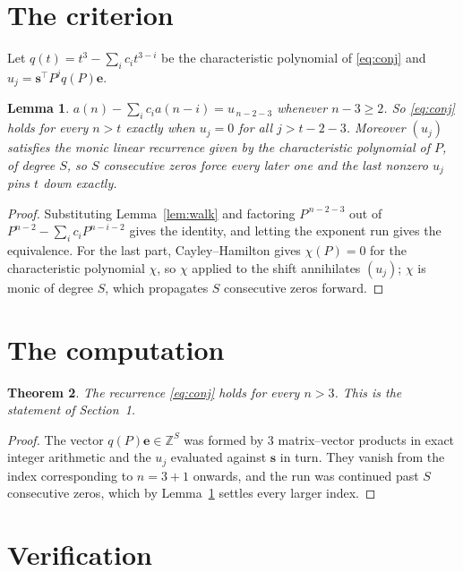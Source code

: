 \documentclass[11pt,a4paper]{article}
\theoremstyle{plain}
\newtheorem{theorem}{Theorem}
\newtheorem{lemma}[theorem]{Lemma}
\theoremstyle{definition}
\begin{document}
\section{The criterion}

Let $q(t)=t^{3}-\sum_i c_i t^{3-i}$ be the characteristic polynomial of
\eqref{eq:conj} and $u_j=\mathbf{s}^{\!\top}P^{j}q(P)\mathbf{e}$.

\begin{lemma}\label{lem:crit}
$a(n)-\sum_i c_i a(n-i)=u_{\,n-2-3}$ whenever $n-3\ge2$. So \eqref{eq:conj}
holds for every $n>t$ exactly when $u_j=0$ for all $j>t-2-3$. Moreover $(u_j)$
satisfies the monic linear recurrence given by the characteristic polynomial of $P$, of
degree $S$, so $S$ consecutive zeros force every later one and the last nonzero $u_j$ pins
$t$ down exactly.
\end{lemma}

\begin{proof}
Substituting Lemma~\ref{lem:walk} and factoring $P^{\,n-2-3}$ out of
$P^{n-2}-\sum_i c_i P^{n-i-2}$ gives the identity, and letting the exponent run gives the
equivalence. For the last part, Cayley--Hamilton gives $\chi(P)=0$ for the characteristic
polynomial $\chi$, so $\chi$ applied to the shift annihilates $(u_j)$; $\chi$ is monic of
degree $S$, which propagates $S$ consecutive zeros forward.
\end{proof}

\section{The computation}

\begin{theorem}
The recurrence \eqref{eq:conj} holds for every $n>3$. This is the statement of
Section~1.
\end{theorem}

\begin{proof}
The vector $q(P)\mathbf{e}\in\mathbb{Z}^{S}$ was formed by $3$ matrix--vector
products in exact integer arithmetic and the $u_j$ evaluated against $\mathbf{s}$ in turn.
They vanish from the index corresponding to $n=3+1$ onwards, and the run was continued
past $S$ consecutive zeros, which by Lemma~\ref{lem:crit} settles every larger index.
\end{proof}

\section{Verification}
\end{document}
